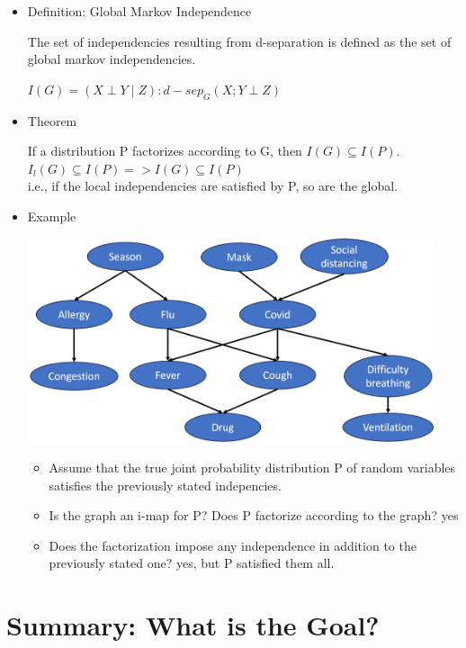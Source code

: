 \documentclass[11pt,a4paper]{report}
\begin{document}
\begin{itemize}
    \item Definition: Global Markov Independence 
    
    The set of independencies resulting from d-separation is defined as the set of global markov independencies.

    \begin{center}
        $I(G) = {(X \perp Y \mid Z): d-sep_{G}(X; Y \perp Z)}$
    \end{center}

    \item Theorem

    \begin{center}
        If a distribution P factorizes according to G, then $I(G) \subseteq I(P)$.\\

        $I_{l}(G) \subseteq I(P) => I(G) \subseteq I(P)$\\
        i.e., if the local independencies are satisfied by P, so are the global.
    \end{center}

    \item Example
    
    \includegraphics[width = 12cm, height = 6cm]{bn_global_indep.png}
    \begin{itemize}
        \item Assume that the true joint probability distribution P of random variables satisfies the previously stated indepencies.
        \item Is the graph an i-map for P? Does P factorize according to the graph? yes
        \item Does the factorization impose any independence in addition to the previously stated one? yes, but P satisfied them all.
    \end{itemize}
\end{itemize}

\section{Summary: What is the Goal?}
\end{document}
